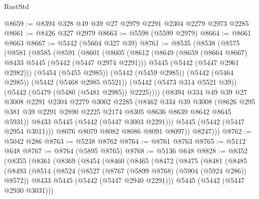 \begin{lexlean}{RustStd}
\begin{coremodule}
@8659 := @8394 @328 @49 @39 @27 @2979 @2291 @2304 @2279 @2973 @2285
@8661 := @8426 @327 @2979
@8663 := @5598 (@5599 @2979)
@8664 := @8661 @8663
@8667 := @5442 (@5604 @327 @39)
@8761 := @8535
    (@8538
      (@8575
        (@8581
          (@8585
            (@8591
              (@8601
                (@8605
                  (@8612
                    (@8649
                      (@8659 (@8664 @8667) @8433 @5445 (@5442 (@5447 @2974 @2291)))
                      @5445
                      (@5442 (@5447 @2961 @2982)))
                    (@5454 (@5455 @2985))
                    (@5442 (@5459 @2985))
                    (@5442 (@5464 @2985))
                    (@5442 (@5468 @2985 @5521))
                    (@5442 (@5473 @314 @5521 @39))
                    (@5442 (@5479 (@5480 (@5481 @2985)) @2225))))
                (@8394
                  @334
                  @49
                  @39
                  @27
                  @3008
                  @2291
                  @2304
                  @2279
                  @3002
                  @2285
                  (@8462
                    @334
                    @39
                    @3008
                    (@8626
                      @295
                      @381
                      @39
                      @2291
                      @2890
                      @2225
                      @2174
                      @8305
                      @8636
                      @8639
                      @8642
                      @8645
                      @5931))
                  @8433
                  @5445
                  (@5442 (@5447 @3003 @2291)))
                @5445
                (@5442 (@5447 @2954 @3011)))
              @8076
              @8079
              @8082
              @8086
              @8091
              @8097))
          @8247)))
@8762 := @5042 @286
@8763 := @5238 @8762
@8764 := @8761 @8763
@8765 := @5112 @648
@8767 := @8764 (@5895 @8765)
@8768 := @5136 @648
@8828 := @8352
    (@8355
      (@8361
        (@8369
          (@8454
            (@8460
              (@8465
                (@8472
                  (@8475
                    (@8481
                      (@8485
                        (@8493
                          (@8514
                            (@8524
                              (@8527 (@8767 (@5899 @8768) (@5904 (@5924 @286)) @8572))
                              @8433
                              @5445
                              (@5442 (@5447 @2940 @2291)))
                            @5445
                            (@5442 (@5447 @2930 @3031)))

\end{coremodule}
\end{lexlean}
